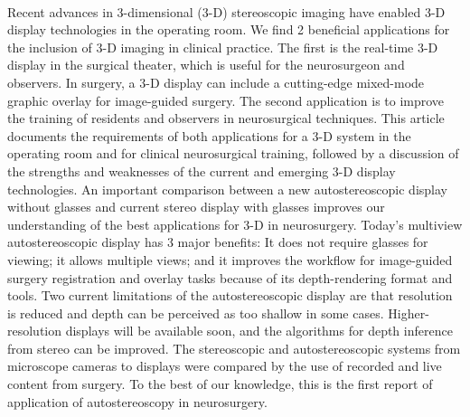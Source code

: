 \paragraph{}Recent advances in 3-dimensional (3-D) stereoscopic imaging have enabled 3-D display technologies in the operating room. We find 2 beneficial applications for the inclusion of 3-D imaging in clinical practice. The first is the real-time 3-D display in the surgical theater, which is useful for the neurosurgeon and observers. In surgery, a 3-D display can include a cutting-edge mixed-mode graphic overlay for image-guided surgery. The second application is to improve the training of residents and observers in neurosurgical techniques. This article documents the requirements of both applications for a 3-D system in the operating room and for clinical neurosurgical training, followed by a discussion of the strengths and weaknesses of the current and emerging 3-D display technologies. An important comparison between a new autostereoscopic display without glasses and current stereo display with glasses improves our understanding of the best applications for 3-D in neurosurgery. Today's multiview autostereoscopic display has 3 major benefits: It does not require glasses for viewing; it allows multiple views; and it improves the workflow for image-guided surgery registration and overlay tasks because of its depth-rendering format and tools. Two current limitations of the autostereoscopic display are that resolution is reduced and depth can be perceived as too shallow in some cases. Higher-resolution displays will be available soon, and the algorithms for depth inference from stereo can be improved. The stereoscopic and autostereoscopic systems from microscope cameras to displays were compared by the use of recorded and live content from surgery. To the best of our knowledge, this is the first report of application of autostereoscopy in neurosurgery.